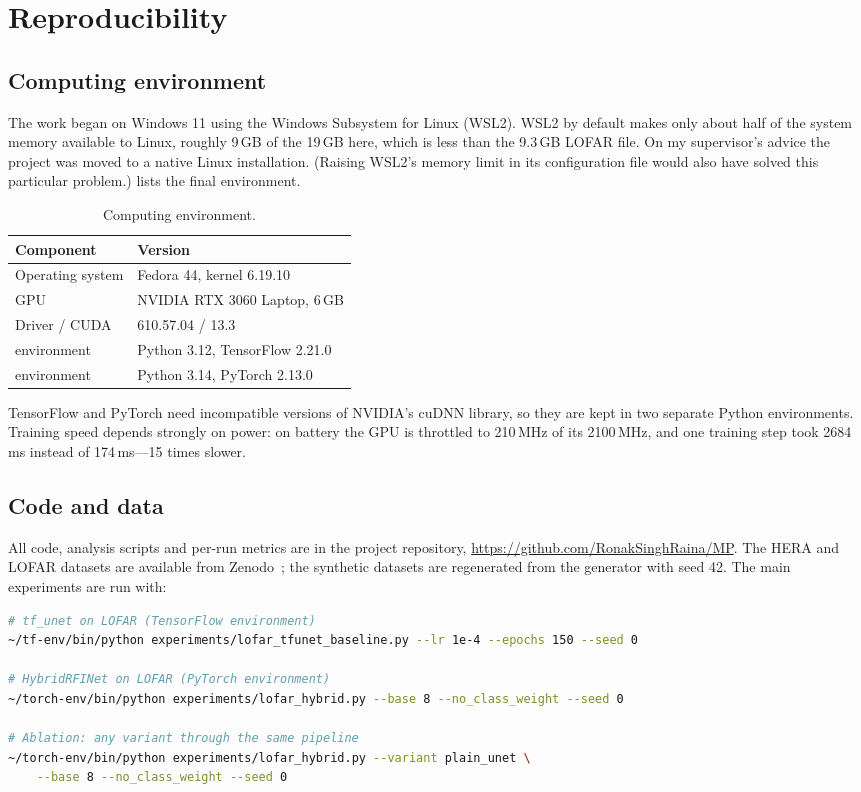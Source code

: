 \chapter{Reproducibility}
\label{app:repro}

\section{Computing environment}
The work began on Windows 11 using the Windows Subsystem for Linux (WSL2). WSL2
by default makes only about half of the system memory available to Linux,
roughly 9\,GB of the 19\,GB here, which is less than the 9.3\,GB LOFAR file. On
my supervisor's advice the project was moved to a native Linux installation.
(Raising WSL2's memory limit in its configuration file would also have solved
this particular problem.)  lists the final environment.

\begin{table}[H]
  \centering
  \caption{Computing environment.}
  \label{tab:env}
  \begin{tabular}{ll}
    \toprule
    Component & Version \\
    \midrule
    Operating system & Fedora 44, kernel 6.19.10 \\
    GPU & NVIDIA RTX 3060 Laptop, 6\,GB \\
    Driver / CUDA & 610.57.04 / 13.3 \\
    \tfunet{} environment & Python 3.12, TensorFlow 2.21.0 \\
    \hybrid{} environment & Python 3.14, PyTorch 2.13.0 \\
    \bottomrule
  \end{tabular}
\end{table}

TensorFlow and PyTorch need incompatible versions of NVIDIA's cuDNN library, so
they are kept in two separate Python environments. Training speed depends
strongly on power: on battery the GPU is throttled to 210\,MHz of its 2100\,MHz,
and one \tfunet{} training step took 2684\,ms instead of 174\,ms---15 times
slower.

\section{Code and data}
All code, analysis scripts and per-run metrics are in the project repository,
\url{https://github.com/RonakSinghRaina/MP}. The HERA and LOFAR datasets are
available from Zenodo~\cite{mesarcik2022data}; the synthetic datasets are
regenerated from the generator with seed 42. The main experiments are run with:
\begin{lstlisting}[language=bash]
# tf_unet on LOFAR (TensorFlow environment)
~/tf-env/bin/python experiments/lofar_tfunet_baseline.py --lr 1e-4 --epochs 150 --seed 0

# HybridRFINet on LOFAR (PyTorch environment)
~/torch-env/bin/python experiments/lofar_hybrid.py --base 8 --no_class_weight --seed 0

# Ablation: any variant through the same pipeline
~/torch-env/bin/python experiments/lofar_hybrid.py --variant plain_unet \
    --base 8 --no_class_weight --seed 0
\end{lstlisting}
